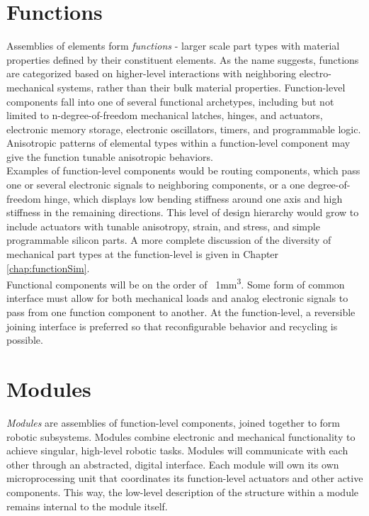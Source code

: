 {\section{Functions}

Assemblies of elements form \textit{functions} - larger scale part types with material properties defined by their constituent elements.  As the name suggests, functions are categorized based on higher-level interactions with neighboring electro-mechanical systems, rather than their bulk material properties.  Function-level components fall into one of several functional archetypes, including but not limited to n-degree-of-freedom mechanical latches, hinges, and actuators, electronic memory storage, electronic oscillators, timers, and programmable logic.  Anisotropic patterns of elemental types within a function-level component may give the function tunable anisotropic behaviors.\\

Examples of function-level components would be routing components, which pass one or several electronic signals to neighboring components, or a one degree-of-freedom hinge, which displays low bending stiffness around one axis and high stiffness in the remaining directions.  This level of design hierarchy would grow to include actuators with tunable anisotropy, strain, and stress, and simple programmable silicon parts.  A more complete discussion of the diversity of mechanical part types at the function-level is given in Chapter \ref{chap:functionSim}.\\

Functional components will be on the order of ~1mm\textsuperscript{3}.  Some form of common interface must allow for both mechanical loads and analog electronic signals to pass from one function component to another.  At the function-level, a reversible joining interface is preferred so that reconfigurable behavior and recycling is possible.

\section{Modules}

\textit{Modules} are assemblies of function-level components, joined together to form robotic subsystems.  Modules combine electronic and mechanical functionality to achieve singular, high-level robotic tasks.  Modules will communicate with each other through an abstracted, digital interface.  Each module will own its own microprocessing unit that coordinates its function-level actuators and other active components.  This way, the low-level description of the structure within a module remains internal to the module itself.\\

}
